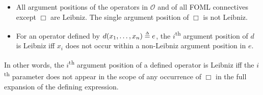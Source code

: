 \documentclass[a4paper,fleqn,envcountsame,orivec]{llncs}
\renewcommand{\th}{\textsuperscript{th}\xspace}
\newcommand{\OO}{\mathcal{O}}
\newcommand{\edmargin}[2]{\marginpar{\raggedright\footnotesize\color{red}#1: #2}}
\newcommand{\edmargin}[2]{}
\def\llmargin{\edmargin{LL}}
\def\jknote{\ednote{JK}}
\begin{document}
\begin{definition}\label{def:leibniz-pos}
  \begin{itemize}
  \item All argument positions of the operators in $\OO$ and of all FOML
    connectives except $\Box$ are Leibniz. The single argument position of $\Box$
    is not Leibniz.
  \item For an operator defined by $d(x_1,\ldots,x_n) \mathrel{\stackrel{\scriptscriptstyle\Delta}{=}} e$, the
    $i$\th argument position of $d$ is Leibniz iff
    $x_i$ does not occur within a non-Leibniz argument position in $e$.
  \end{itemize}
\end{definition}
%
In other words, the $i$\th argument position of a defined operator is Leibniz iff
the $i$\th parameter does not appear in the scope of any
 occurrence of $\Box$
in the full expansion of the defining expression.
\end{document}
